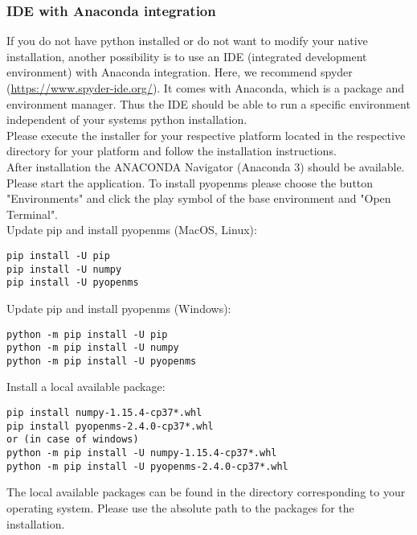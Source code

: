 {\subsubsection{IDE with Anaconda integration}
If you do not have python installed or do not want to modify your native installation, another possibility is to use an IDE (integrated development environment) with Anaconda integration. Here, we recommend spyder (\url{https://www.spyder-ide.org/}). It comes with Anaconda, which is a package and environment manager. Thus the IDE should be able to run a specific environment independent of your systems python installation. \\

\noindent Please execute the installer for your respective platform located in the respective directory for your platform and follow the installation instructions. \\

\noindent After installation the ANACONDA Navigator (Anaconda 3) should be available. Please start the application. To install pyopenms please choose the button "Environments" and click the play symbol of the base environment and "Open Terminal". \\

\noindent  Update pip and install pyopenms (MacOS, Linux):
\begin{code}
\begin{verbatim}
pip install -U pip
pip install -U numpy
pip install -U pyopenms
\end{verbatim}
\end{code}

\noindent  Update pip and install pyopenms (Windows):
\begin{code}
\begin{verbatim}
python -m pip install -U pip
python -m pip install -U numpy
python -m pip install -U pyopenms
\end{verbatim}
\end{code}

\noindent Install a local available package:
\begin{code}
\begin{verbatim}
pip install numpy-1.15.4-cp37*.whl
pip install pyopenms-2.4.0-cp37*.whl
or (in case of windows)
python -m pip install -U numpy-1.15.4-cp37*.whl
python -m pip install -U pyopenms-2.4.0-cp37*.whl
\end{verbatim}
\end{code}

\noindent The local available packages can be found in the directory corresponding to your operating system. Please use the absolute path to the packages for the installation.
    
}
